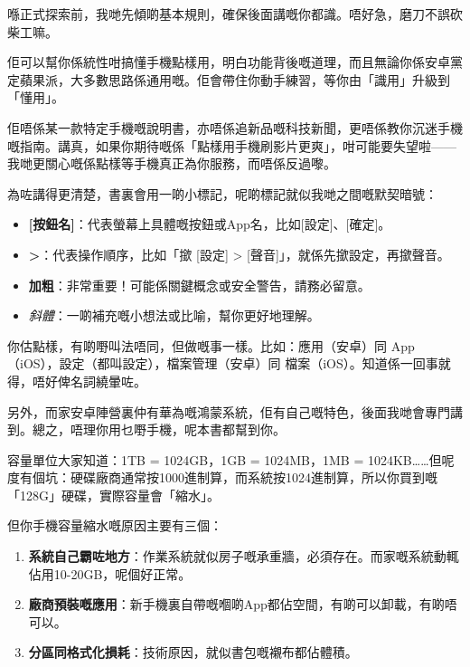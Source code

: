 
喺正式探索前，我哋先傾啲基本規則，確保後面講嘅你都識。唔好急，磨刀不誤砍柴工嘛。


佢可以幫你係統性咁搞懂手機點樣用，明白功能背後嘅道理，而且無論你係安卓黨定蘋果派，大多數思路係通用嘅。佢會帶住你動手練習，等你由「識用」升級到「懂用」。

佢唔係某一款特定手機嘅說明書，亦唔係追新品嘅科技新聞，更唔係教你沉迷手機嘅指南。講真，如果你期待嘅係「點樣用手機刷影片更爽」，咁可能要失望啦——我哋更關心嘅係點樣等手機真正為你服務，而唔係反過嚟。


為咗講得更清楚，書裏會用一啲小標記，呢啲標記就似我哋之間嘅默契暗號：

\begin{itemize}
  \item \textbf{[按鈕名]}：代表螢幕上具體嘅按鈕或App名，比如[設定]、[確定]。
  \item \textbf{>}：代表操作順序，比如「撳 [設定] > [聲音]」，就係先撳設定，再撳聲音。
  \item \textbf{加粗}：非常重要！可能係關鍵概念或安全警告，請務必留意。
  \item \emph{斜體}：一啲補充嘅小想法或比喻，幫你更好地理解。
\end{itemize}


你估點樣，有啲嘢叫法唔同，但做嘅事一樣。比如：應用（安卓）同 App（iOS），設定（都叫設定），檔案管理（安卓）同 檔案（iOS）。知道係一回事就得，唔好俾名詞繞暈咗。

另外，而家安卓陣營裏仲有華為嘅鴻蒙系統，佢有自己嘅特色，後面我哋會專門講到。總之，唔理你用乜嘢手機，呢本書都幫到你。


容量單位大家知道：1TB = 1024GB，1GB = 1024MB，1MB = 1024KB……但呢度有個坑：硬碟廠商通常按1000進制算，而系統按1024進制算，所以你買到嘅「128G」硬碟，實際容量會「縮水」。

但你手機容量縮水嘅原因主要有三個：

\begin{enumerate}
  \item \textbf{系統自己霸咗地方}：作業系統就似房子嘅承重牆，必須存在。而家嘅系統動輒佔用10-20GB，呢個好正常。
  \item \textbf{廠商預裝嘅應用}：新手機裏自帶嘅嗰啲App都佔空間，有啲可以卸載，有啲唔可以。
  \item \textbf{分區同格式化損耗}：技術原因，就似書包嘅襯布都佔體積。
\end{enumerate}

